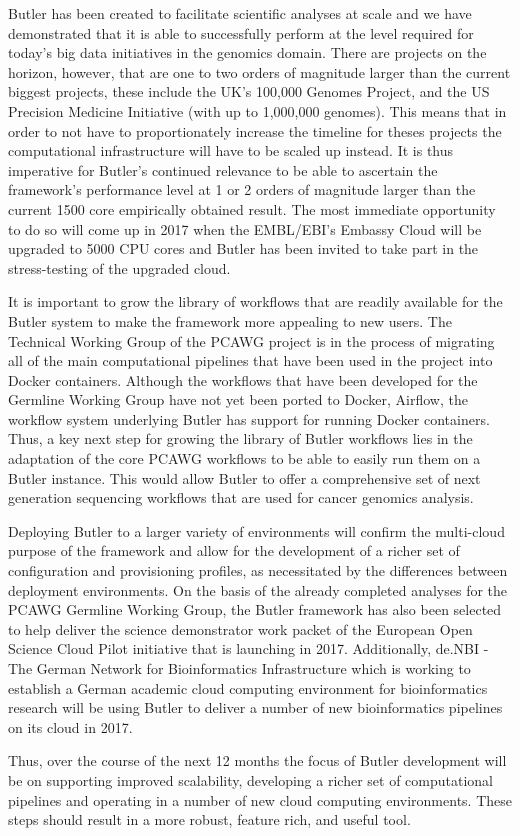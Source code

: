 Butler has been created to facilitate scientific analyses at scale and we have demonstrated that it is able to successfully perform at the level required for today's big data initiatives in the genomics domain. There are projects on the horizon, however, that are one to two orders of magnitude larger than the current biggest projects, these include the UK's 100,000 Genomes Project\autocite{marx2015dna}, and the US Precision Medicine Initiative\autocite{collins2015new} (with up to 1,000,000 genomes). This means that in order to not have to proportionately increase the timeline for theses projects the computational infrastructure will have to be scaled up instead. It is thus imperative for Butler's continued relevance to be able to ascertain the framework's performance level at 1 or 2 orders of magnitude larger than the current 1500 core empirically obtained result. The most immediate opportunity to do so will come up in 2017 when the EMBL/EBI's Embassy Cloud will be upgraded to 5000 CPU cores and Butler has been invited to take part in the stress-testing of the upgraded cloud. 

It is important to grow the library of workflows that are readily available for the Butler system to make the framework more appealing to new users. The Technical Working Group of the PCAWG project is in the process of migrating all of the main computational pipelines that have been used in the project into Docker\autocite{merkel2014docker} containers. Although the workflows that have been developed for the Germline Working Group have not yet been ported to Docker, Airflow, the workflow system underlying Butler has support for running Docker containers. Thus, a key next step for growing the library of Butler workflows lies in the adaptation of the core PCAWG workflows to be able to easily run them on a Butler instance. This would allow Butler to offer a comprehensive set of next generation sequencing workflows that are used for cancer genomics analysis.

Deploying Butler to a larger variety of environments will confirm the multi-cloud purpose of the framework and allow for the development of a richer set of configuration and provisioning profiles, as necessitated by the differences between deployment environments. On the basis of the already completed analyses for the PCAWG Germline Working Group, the Butler framework has also been selected to help deliver the science demonstrator work packet of the European Open Science Cloud Pilot\autocite{European_Open_Science_Cloud_2016} initiative that is launching in 2017. Additionally, de.NBI - The German Network for Bioinformatics Infrastructure\autocite{denbi_2016-10-31} which is working to establish a German academic cloud computing environment for bioinformatics research will be using Butler to deliver a number of new bioinformatics pipelines on its cloud in 2017.

Thus, over the course of the next 12 months the focus of Butler development will be on supporting improved scalability, developing a richer set of computational pipelines and operating in a number of new cloud computing environments. These steps should result in a more robust, feature rich, and useful tool.